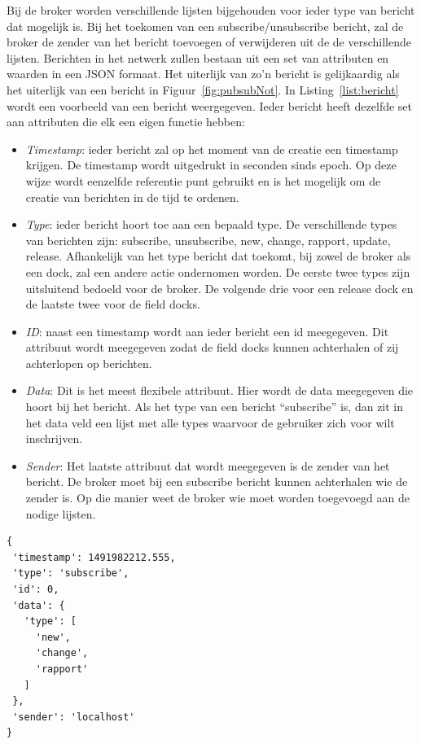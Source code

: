 Bij de broker worden verschillende lijsten bijgehouden voor ieder type van bericht dat mogelijk is.
Bij het toekomen van een subscribe/unsubscribe bericht, zal de broker de zender van het bericht toevoegen of verwijderen uit de de verschillende lijsten.
Berichten in het netwerk zullen bestaan uit een set van attributen en waarden in een JSON formaat.
Het uiterlijk van zo'n bericht is gelijkaardig als het uiterlijk van een bericht in Figuur~\ref{fig:pubsubNot}.
In Listing~\ref{list:bericht} wordt een voorbeeld van een bericht weergegeven.
Ieder bericht heeft dezelfde set aan attributen die elk een eigen functie hebben:
\begin{itemize}
\item \emph{Timestamp}: ieder bericht zal op het moment van de creatie een timestamp krijgen.
De timestamp wordt uitgedrukt in seconden sinds epoch.
Op deze wijze wordt eenzelfde referentie punt gebruikt en is het mogelijk om de creatie van berichten in de tijd te ordenen.
\item \emph{Type}: ieder bericht hoort toe aan een bepaald type.
De verschillende types van berichten zijn: subscribe, unsubscribe, new, change, rapport, update, release.
Afhankelijk van het type bericht dat toekomt, bij zowel de broker als een dock, zal een andere actie ondernomen worden.
De eerste twee types zijn uitsluitend bedoeld voor de broker.
De volgende drie voor een release dock en de laatste twee voor de field docks.
\item \emph{ID}: naast een timestamp wordt aan ieder bericht een id meegegeven. 
Dit attribuut wordt meegegeven zodat de field docks kunnen achterhalen of zij achterlopen op berichten.
\item \emph{Data}: Dit is het meest flexibele attribuut. 
Hier wordt de data meegegeven die hoort bij het bericht.
Als het type van een bericht ``subscribe'' is, dan zit in het data veld een lijst met alle types waarvoor de gebruiker zich voor wilt inschrijven.
\item \emph{Sender}: Het laatste attribuut dat wordt meegegeven is de zender van het bericht.
De broker moet bij een subscribe bericht kunnen achterhalen wie de zender is.
Op die manier weet de broker wie moet worden toegevoegd aan de nodige lijsten.
\end{itemize}

\begin{minipage}{\linewidth}
\begin{center}
\begin{lstlisting}[caption={Formaat voor een bericht},label={list:bericht}, xleftmargin=.3\textwidth]
{
 'timestamp': 1491982212.555,
 'type': 'subscribe',
 'id': 0,
 'data': {
   'type': [
     'new',
     'change',
     'rapport'
   ]
 },
 'sender': 'localhost'
}
\end{lstlisting}
\end{center}
\end{minipage}

